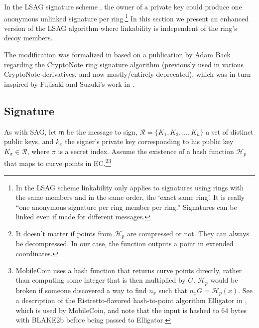 In the LSAG signature scheme \cite{Liu2004}, the owner of a private key could produce one anonymous unlinked signature per ring.\footnote{\label{lsag_linkability_note}In the LSAG scheme linkability only applies to signatures using rings with the same members and in the same order, the `exact same ring'. It is really ``one anonymous signature per ring member per ring.” Signatures can be linked even if made for different messages.} In this section we present an enhanced version of the LSAG algorithm where linkability is independent of the ring’s decoy members.

The modification was formalized in \cite{MRL-0005-ringct} based on a publication by Adam Back \cite{AdamBack-ring-efficiency} regarding the CryptoNote \cite{cryptoNoteWhitePaper} ring signature algorithm (previously used in various CryptoNote derivatives, and now mostly/entirely deprecated), which was in turn inspired by Fujisaki and Suzuki's work in \cite{Fujisaki2007}.


\subsection*{Signature}

As with SAG, let \(\mathfrak{m}\) be the message to sign, \(\mathcal{R} = \{K_1, K_2, ..., K_n\}\) a set of distinct public keys, and \(k_\pi\) the signer's private key corresponding to his public key \(K_\pi \in \mathcal{R}\), where $\pi$ is a secret index. Assume the existence of a hash function \(\mathcal{H}_p\) that maps to curve points in EC.\footnote{It doesn’t matter if points from $\mathcal{H}_p$ are compressed or not. They can always be decompressed. In our case, the function outputs a point in extended coordinates.}\footnote{MobileCoin uses a hash function that returns curve points directly, rather than computing some integer that is then multiplied by $G$. $\mathcal{H}_p$ would be broken if someone discovered a way to find $n_x$ such that $n_x G = \mathcal{H}_p(x)$. See a description of the Ristretto-flavored hash-to-point algorithm Elligator in \cite{ristretto-elligator}, which is used by MobileCoin, and note that the input is hashed to 64 bytes with BLAKE2b before being passed to Elligator.}

